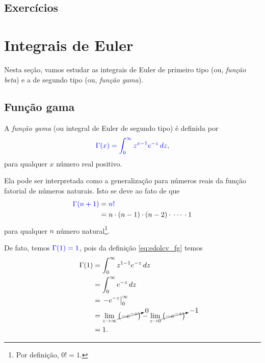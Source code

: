 \subsection*{Exercícios}

\emconstrucao

\section{Integrais de Euler}\label{cap_edolcv_sec_ieuler}

Nesta seção, vamos estudar as integrais de Euler de primeiro tipo (ou, \emph{função beta}) e a de segundo tipo (ou, \emph{função gama}).

\subsection{Função gama}

A \emph{função gama} (ou integral de Euler de segundo tipo) é definida por
\begin{equation}\label{eq:edolcv_fg}
  {\color{blue}\Gamma(x) = \int_0^\infty z^{x-1}e^{-z}\,dz},
\end{equation}
para qualquer $x$ número real positivo.

Ela pode ser interpretada como a generalização para números reais da função fatorial de números naturais. Isto se deve ao fato de que
\begin{align}
  {\color{blue}\Gamma(n+1)} &= {\color{blue}n!}\\
                            &= n\cdot (n-1)\cdot (n-2)\cdot\, \cdots\, \cdot 1
\end{align}
para qualquer $n$ número natural\footnote{Por definição, $0!=1$.}.

De fato, temos ${\color{blue}\Gamma(1) = 1}$, pois da definição \eqref{eq:edolcv_fg} temos
\begin{align}
  \Gamma(1) &= \int_0^\infty z^{1-1}e^{-z}\,dz\\
            &= \int_0^\infty e^{-z}\,dz\\
            &= \left.-e^{-z}\right|_{0}^{\infty}\\
            &= \lim_{z\to\infty} \cancelto{0}{\left(-e^{-z}\right)} - \lim_{z\to 0} \cancelto{-1}{\left(-e^{-z}\right)}\\
            &= 1.
\end{align}

